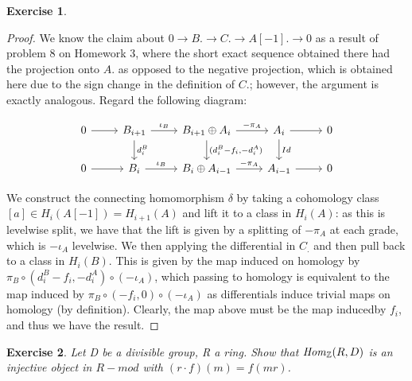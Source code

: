 \documentclass{article}
\newcommand{\bb}[1]{\mathbb{#1}}
\newtheorem{exercise}{Exercise}
\begin{document}
\begin{exercise}
\end{exercise}
\begin{proof}
  We know the claim about $0\to B. \to C. \to A[-1]. \to 0$ as a result of problem 8 on Homework 3, where the short exact sequence obtained there had the projection onto $A.$ as opposed to the negative projection, which is obtained here due to the sign change in the definition of $C.$; however, the argument is exactly analogous. Regard the following diagram:

  \[
    \begin{tikzcd}
0 \arrow[r] & B_{i+1} \arrow[r, "\iota_B"] \arrow[d, "d_i^B"] & B_{i+1} \oplus A_i \arrow[r, "-\pi_A"] \arrow[d, "{(d_i^B -f_i , -d_i^A)}"] & A_i  \arrow[d, "Id"] \arrow[r] & 0 \\
0 \arrow[r] & B_{i}  \arrow[r, "\iota_B"]                     & B_{i} \oplus A_{i-1} \arrow[r, "-\pi_A"]                                    & A_{i-1} \arrow[r]              & 0
\end{tikzcd}
\]

We construct the connecting homomorphism $\delta$ by taking a cohomology class $[a] \in H_{i}(A[-1]) = H_{i+1}(A)$ and lift it to a class in $H_{i}(A)$: as this is levelwise split, we have that the lift is given by a splitting of $-\pi_{A}$ at each grade, which is $-\iota_{A}$ levelwise. We then applying the differential in $C_{.}$ and then pull back to a class in $H_{i}(B)$. This is given by the map induced on homology by $\pi_{B} \circ (d_{i}^{B} - f_{i}, -d_{i}^{A}) \circ (-\iota_{A})$, which passing to homology is equivalent to the map induced by $\pi_{B} \circ (- f_{i}, 0) \circ (-\iota_{A})$ as differentials induce trivial maps on homology (by definition). Clearly, the map above must be the map inducedby $f_{i}$, and thus we have the result.   
\end{proof}

\newpage

\begin{exercise}
  Let D be a divisible group, R a ring. Show that $\text{\emph{Hom}}_{\bb{Z}}(R, D)$ is an injective object in $R-mod$ with $(r \cdot f)(m) = f(mr)$.
\end{exercise}
\end{document}
